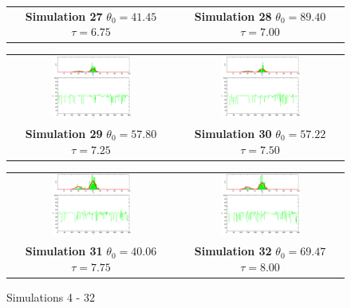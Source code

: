 \begin{figure}
\begin{tabular}{cc}
\textbf{Simulation 27} $\theta_0=   41.45$  $\tau=    6.75$  & \textbf{Simulation 28} $\theta_0=   89.40$  $\tau=    7.00$
\end{tabular}
\begin{tabular}{cc} 
\includegraphics[width=0.5\textwidth]{ImaginiLatex/MetropolisExample29.eps} &
\includegraphics[width=0.5\textwidth]{ImaginiLatex/MetropolisExample30.eps} \\
\textbf{Simulation 29} $\theta_0=   57.80$  $\tau=    7.25$  & \textbf{Simulation 30} $\theta_0=   57.22$  $\tau=    7.50$
\end{tabular}
\begin{tabular}{cc} 
\includegraphics[width=0.5\textwidth]{ImaginiLatex/MetropolisExample31.eps} &
\includegraphics[width=0.5\textwidth]{ImaginiLatex/MetropolisExample32.eps} \\
\textbf{Simulation 31} $\theta_0=   40.06$  $\tau=    7.75$  & \textbf{Simulation 32} $\theta_0=   69.47$  $\tau=    8.00$
\end{tabular}
\caption{Simulations 4 - 32}
\end{figure}
